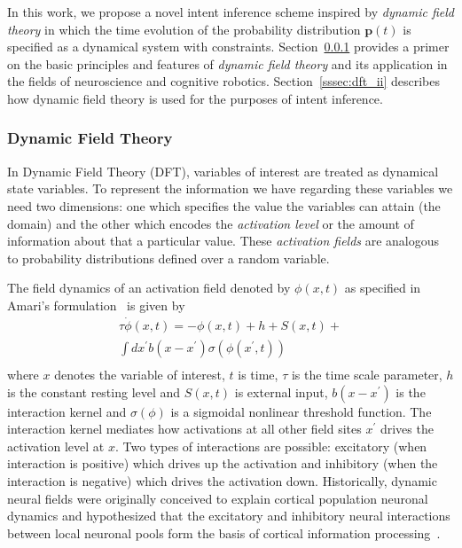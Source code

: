 In this work, we propose a novel intent inference scheme inspired by \textit{dynamic field theory} in which the time evolution of the probability distribution $\boldsymbol{p}(t)$ is specified as a dynamical system with constraints. Section~\ref{sssec:dft} provides a primer on the basic principles and features of \textit{dynamic field theory} and its application in the fields of neuroscience and cognitive robotics. Section~\ref{sssec:dft_ii} describes how dynamic field theory is used for the purposes of intent inference. 

\subsubsection{Dynamic Field Theory}\label{sssec:dft}

In Dynamic Field Theory (DFT), variables of interest are treated as dynamical state variables. To represent the information we have regarding these variables we need two dimensions: one which specifies the value the variables can attain (the domain) and the other which encodes the \textit{activation level} or the amount of information about that a particular value. These \textit{activation fields} are analogous to probability distributions defined over a random variable. 

The field dynamics of an activation field denoted by $\phi(x, t)$ as specified in Amari's formulation~\cite{amari1977dynamics} is given by 
\begin{multline}
\tau\dot{\phi}(x,t) = -\phi(x,t) + h + S(x,t) + \\ \int\limits_{}^{}dx^{\prime}b(x-x^{\prime})\sigma(\phi(x^{\prime}, t)) 
\end{multline} 
where $x$ denotes the variable of interest, $t$ is time, $\tau$ is the time scale parameter, $h$ is the constant resting level and $S(x,t)$ is external input, $b(x-x^\prime)$ is the interaction kernel and $\sigma(\phi)$ is a sigmoidal nonlinear threshold function. The interaction kernel mediates how activations at all other field sites $x^\prime$ drives the activation level at $x$. Two types of interactions are possible: excitatory (when interaction is positive) which drives up the activation and inhibitory (when the interaction is negative) which drives the activation down. 
Historically, dynamic neural fields were originally conceived to explain cortical population neuronal dynamics and hypothesized that the excitatory and inhibitory neural interactions between local neuronal pools form the basis of cortical information processing~\cite{wilson1973mathematical}. 

